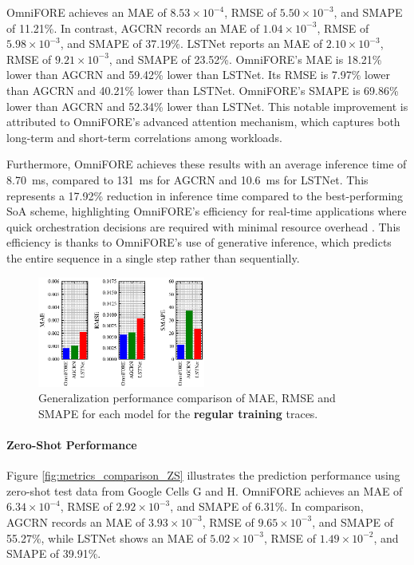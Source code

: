 OmniFORE achieves an MAE of $8.53 \times 10^{-4}$, RMSE of $5.50 \times 10^{-3}$, and SMAPE of 11.21\%. In contrast, AGCRN records an MAE of $1.04 \times 10^{-3}$, RMSE of $5.98 \times 10^{-3}$, and SMAPE of 37.19\%. LSTNet reports an MAE of $2.10 \times 10^{-3}$, RMSE of $9.21 \times 10^{-3}$, and SMAPE of 23.52\%. OmniFORE's MAE is 18.21\% lower than AGCRN and 59.42\% lower than LSTNet. Its RMSE is 7.97\% lower than AGCRN and 40.21\% lower than LSTNet. OmniFORE's SMAPE is 69.86\% lower than AGCRN and 52.34\% lower than LSTNet. This notable improvement is attributed to OmniFORE's advanced attention mechanism, which captures both long-term and short-term correlations among workloads.

Furthermore, OmniFORE achieves these results with an average inference time of \SI{8.70}{\milli\second}, compared to \SI{131}{\milli\second} for AGCRN and \SI{10.6}{\milli\second} for LSTNet. This represents a 17.92\% reduction in inference time compared to the best-performing SoA scheme, highlighting OmniFORE's efficiency for real-time applications where quick orchestration decisions are required with minimal resource overhead \cite{9500858, 8334540}. This efficiency is thanks to OmniFORE's use of generative inference, which predicts the entire sequence in a single step rather than sequentially.

\begin{figure}%
\centering
\includegraphics[width=0.49\textwidth]{img/metrics_comparison_regular.eps}
\caption{Generalization performance comparison of MAE, RMSE and SMAPE for each model for the \textbf{regular training} traces.}
\label{fig:metrics_comparison_regular}
\end{figure}

\paragraph*{Zero-Shot Performance}
Figure \ref{fig:metrics_comparison_ZS} illustrates the prediction performance using zero-shot test data from Google Cells G and H. OmniFORE achieves an MAE of $6.34 \times 10^{-4}$, RMSE of $2.92 \times 10^{-3}$, and SMAPE of 6.31\%. In comparison, AGCRN records an MAE of $3.93 \times 10^{-3}$, RMSE of $9.65 \times 10^{-3}$, and SMAPE of 55.27\%, while LSTNet shows an MAE of $5.02 \times 10^{-3}$, RMSE of $1.49 \times 10^{-2}$, and SMAPE of 39.91\%.

